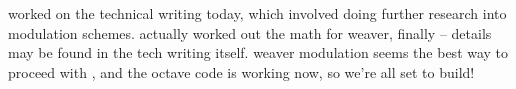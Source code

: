 worked on the technical writing today, which involved doing further research
into \ssb modulation schemes. actually worked out the math for weaver, finally
-- details may be found in the tech writing itself. weaver modulation seems the
best way to proceed with \ssb, and the octave code is working now, so we're all
set to build!
